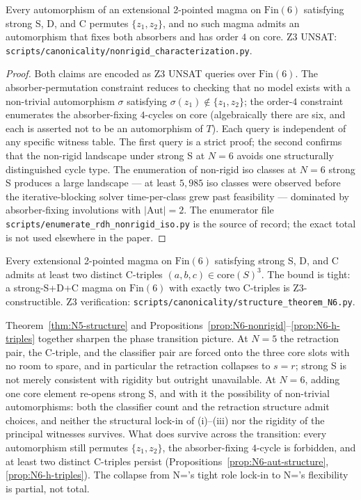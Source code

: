 \documentclass[sigconf,screen]{acmart}
\newcommand{\Fin}{\mathrm{Fin}}
\newcommand{\core}{\mathrm{core}}
\theoremstyle{remark}
\begin{document}
\begin{proposition}[$N\!=\!6$ automorphism constraints under strong S]
\label{prop:N6-aut-structure}
Every automorphism of an extensional 2-pointed magma on $\Fin(6)$ satisfying strong S, D, and C permutes $\{z_1, z_2\}$, and no such magma admits an automorphism that fixes both absorbers and has order $4$ on core. Z3 UNSAT: \texttt{scripts/canonicality/nonrigid\_characterization.py}.
\end{proposition}

\begin{proof}
Both claims are encoded as Z3 UNSAT queries over $\Fin(6)$. The absorber-permutation constraint reduces to checking that no model exists with a non-trivial automorphism $\sigma$ satisfying $\sigma(z_1) \notin \{z_1, z_2\}$; the order-$4$ constraint enumerates the absorber-fixing $4$-cycles on core (algebraically there are six, and each is asserted not to be an automorphism of $T$). Each query is independent of any specific witness table. The first query is a strict proof; the second confirms that the non-rigid landscape under strong S at $N\!=\!6$ avoids one structurally distinguished cycle type. The enumeration of non-rigid iso classes at $N\!=\!6$ strong S produces a large landscape --- at least $5{,}985$ iso classes were observed before the iterative-blocking solver time-per-class grew past feasibility --- dominated by absorber-fixing involutions with $|\mathrm{Aut}| = 2$. The enumerator file \texttt{scripts/enumerate\_rdh\_nonrigid\_iso.py} is the source of record; the exact total is not used elsewhere in the paper.
\end{proof}

\begin{proposition}[$N\!=\!6$ C-triple bound under strong S]
\label{prop:N6-h-triples}
Every extensional 2-pointed magma on $\Fin(6)$ satisfying strong S, D, and C admits at least two distinct C-triples $(a, b, c) \in \core(S)^3$. The bound is tight: a strong-S+D+C magma on $\Fin(6)$ with exactly two C-triples is Z3-constructible. Z3 verification: \texttt{scripts/canonicality/structure\_theorem\_N6.py}.
\end{proposition}

Theorem~\ref{thm:N5-structure} and Propositions~\ref{prop:N6-nonrigid}--\ref{prop:N6-h-triples} together sharpen the phase transition picture. At $N\!=\!5$ the retraction pair, the C-triple, and the classifier pair are forced onto the three core slots with no room to spare, and in particular the retraction collapses to $s = r$; strong S is not merely consistent with rigidity but outright unavailable. At $N\!=\!6$, adding one core element re-opens strong S, and with it the possibility of non-trivial automorphisms: both the classifier count and the retraction structure admit choices, and neither the structural lock-in of (i)--(iii) nor the rigidity of the principal witnesses survives. What does survive across the transition: every automorphism still permutes $\{z_1, z_2\}$, the absorber-fixing $4$-cycle is forbidden, and at least two distinct C-triples persist (Propositions~\ref{prop:N6-aut-structure}, \ref{prop:N6-h-triples}). The collapse from N\!='s tight role lock-in to N\!='s flexibility is partial, not total.
\end{document}

